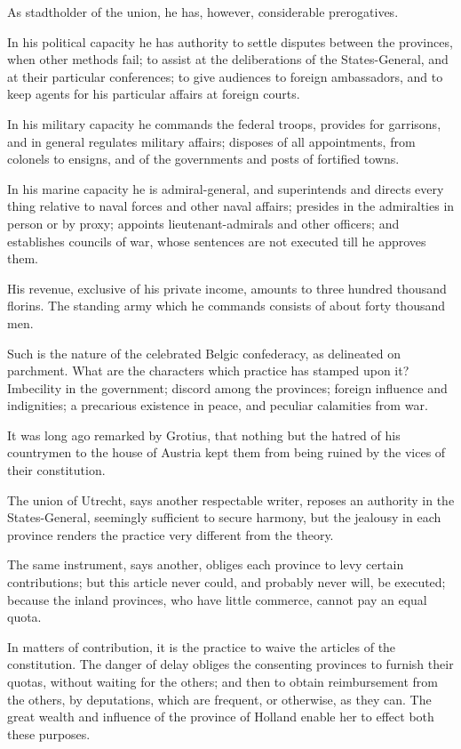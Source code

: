 As stadtholder of the union, he has, however, considerable prerogatives.

In his political capacity he has authority to settle disputes between the provinces, when other methods fail; to assist at the deliberations of the States-General, and at their particular conferences; to give audiences to foreign ambassadors, and to keep agents for his particular affairs at foreign courts.

In his military capacity he commands the federal troops, provides for garrisons, and in general regulates military affairs; disposes of all appointments, from colonels to ensigns, and of the governments and posts of fortified towns.

In his marine capacity he is admiral-general, and superintends and directs every thing relative to naval forces and other naval affairs; presides in the admiralties in person or by proxy; appoints lieutenant-admirals and other officers; and establishes councils of war, whose sentences are not executed till he approves them.

His revenue, exclusive of his private income, amounts to three hundred thousand florins. 
The standing army which he commands consists of about forty thousand men.

Such is the nature of the celebrated Belgic confederacy, as delineated on parchment. 
What are the characters which practice has stamped upon it? 
Imbecility in the government; discord among the provinces; foreign influence and indignities; a precarious existence in peace, and peculiar calamities from war.

It was long ago remarked by Grotius, that nothing but the hatred of his countrymen to the house of Austria kept them from being ruined by the vices of their constitution.

The union of Utrecht, says another respectable writer, reposes an authority in the States-General, seemingly sufficient to secure harmony, but the jealousy in each province renders the practice very different from the theory.

The same instrument, says another, obliges each province to levy certain contributions; but this article never could, and probably never will, be executed; because the inland provinces, who have little commerce, cannot pay an equal quota.

In matters of contribution, it is the practice to waive the articles of the constitution. 
The danger of delay obliges the consenting provinces to furnish their quotas, without waiting for the others; and then to obtain reimbursement from the others, by deputations, which are frequent, or otherwise, as they can. 
The great wealth and influence of the province of Holland enable her to effect both these purposes.

